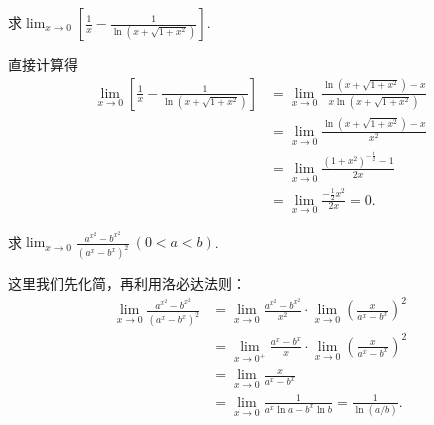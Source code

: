 \begin{example}
求\(\lim_{x\to0} \left[ \frac1x - \frac1{\ln(x+\sqrt{1+x^2})} \right]\).
\begin{solution}
直接计算得\begin{align*}
	\lim_{x\to0} \left[ \frac1x - \frac1{\ln(x+\sqrt{1+x^2})} \right]
	&= \lim_{x\to0} \frac{\ln(x+\sqrt{1+x^2}) - x}{x \ln(x+\sqrt{1+x^2})} \\
	&= \lim_{x\to0} \frac{\ln(x+\sqrt{1+x^2}) - x}{x^2} \\
	&= \lim_{x\to0} \frac{(1+x^2)^{-\frac12}-1}{2x} \\
	&= \lim_{x\to0} \frac{-\frac12 x^2}{2x}
	= 0.
\end{align*}
\end{solution}
\end{example}

\begin{example}
求\(\lim_{x\to0} \frac{a^{x^2}-b^{x^2}}{(a^x-b^x)^2}\ (0<a<b)\).
\begin{solution}
这里我们先化简，再利用洛必达法则：\begin{align*}
	\lim_{x\to0} \frac{a^{x^2}-b^{x^2}}{(a^x-b^x)^2}
	&= \lim_{x\to0} \frac{a^{x^2}-b^{x^2}}{x^2}
		\cdot \lim_{x\to0} \left(\frac{x}{a^x-b^x}\right)^2 \\
	&= \lim_{x\to0^+} \frac{a^x-b^x}{x}
		\cdot \lim_{x\to0} \left(\frac{x}{a^x-b^x}\right)^2 \\
	&= \lim_{x\to0} \frac{x}{a^x-b^x} \\
	&= \lim_{x\to0} \frac{1}{a^x \ln a - b^x \ln b}
	= \frac{1}{\ln(a/b)}.
\end{align*}
\end{solution}
\end{example}
